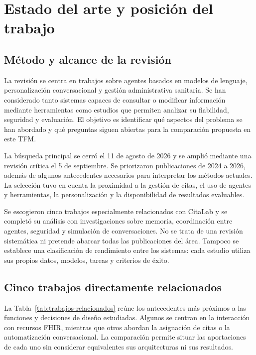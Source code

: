 \chapter{Estado del arte y posición del trabajo}
\label{chap:estado-arte}

\section{Método y alcance de la revisión}

La revisión se centra en trabajos sobre agentes basados en modelos de lenguaje, personalización conversacional y gestión administrativa sanitaria. Se han considerado tanto sistemas capaces de consultar o modificar información mediante herramientas como estudios que permiten analizar su fiabilidad, seguridad y evaluación. El objetivo es identificar qué aspectos del problema se han abordado y qué preguntas siguen abiertas para la comparación propuesta en este TFM.

La búsqueda principal se cerró el 11 de agosto de 2026 y se amplió mediante una revisión crítica el 5 de septiembre. Se priorizaron publicaciones de 2024 a 2026, además de algunos antecedentes necesarios para interpretar los métodos actuales. La selección tuvo en cuenta la proximidad a la gestión de citas, el uso de agentes y herramientas, la personalización y la disponibilidad de resultados evaluables.

Se escogieron cinco trabajos especialmente relacionados con CitaLab y se completó su análisis con investigaciones sobre memoria, coordinación entre agentes, seguridad y simulación de conversaciones. No se trata de una revisión sistemática ni pretende abarcar todas las publicaciones del área. Tampoco se establece una clasificación de rendimiento entre los sistemas: cada estudio utiliza sus propios datos, modelos, tareas y criterios de éxito.

\section{Cinco trabajos directamente relacionados}

La Tabla~\ref{tab:trabajos-relacionados} reúne los antecedentes más próximos a las funciones y decisiones de diseño estudiadas. Algunos se centran en la interacción con recursos FHIR, mientras que otros abordan la asignación de citas o la automatización conversacional. La comparación permite situar las aportaciones de cada uno sin considerar equivalentes sus arquitecturas ni sus resultados.

